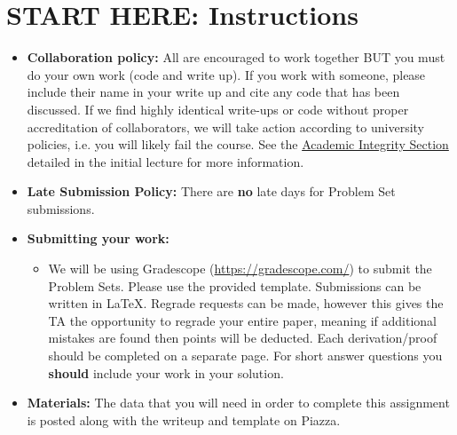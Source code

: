 \documentclass[11pt,addpoints,answers]{exam}
\numberwithin{equation}{section} %
\numberwithin{figure}{section} %
\numberwithin{table}{section} %
\begin{document}
\section*{START HERE: Instructions}
\begin{itemize}
\item \textbf{Collaboration policy:} All are encouraged to work together BUT you must do your own work (code and write up). If you work with someone, please include their name in your write up and cite any code that has been discussed. If we find highly identical write-ups or code without proper accreditation of collaborators, we will take action according to university policies, i.e. you will likely fail the course. See the \href{https://www.dropbox.com/s/z6o0tinc9eaez46/L01_Overview.pdf?dl=0}{Academic Integrity Section} detailed in the initial lecture for more information.

\item\textbf{Late Submission Policy:} There are \textbf{no} late days for Problem Set submissions.

\item\textbf{Submitting your work:}

\begin{itemize}


\item We will be using Gradescope (\url{https://gradescope.com/}) to submit the Problem Sets. Please use the provided template. Submissions can be written in LaTeX. Regrade requests can be made, however this gives the TA the opportunity to regrade your entire paper, meaning if additional mistakes are found then points will be deducted.
Each derivation/proof should be  completed on a separate page. For short answer questions you \textbf{should} include your work in your solution.  %

\end{itemize}

\item \textbf{Materials:} The data that you will need in order to complete this assignment is posted along with the writeup and template on Piazza.

\end{itemize}
\end{document}
